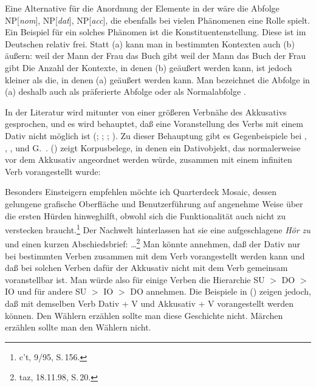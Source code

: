 \noindent
Eine Alternative für die Anordnung der Elemente in der \subcatl wäre die Abfolge 
NP[\textit{nom\/}], NP[\textit{dat}], NP[\textit{acc}], die ebenfalls bei vielen Phänomenen eine Rolle spielt. 
Ein Beispiel für ein solches Phänomen ist die Konstituentenstellung. Diese ist im Deutschen relativ frei. Statt (a) kann
man in bestimmten Kontexten auch (b) äußern:
\eal
\ex weil der Mann der Frau das Buch gibt
\ex weil der Mann das Buch der Frau gibt
\zl
Die Anzahl der Kontexte, in denen (b) geäußert werden kann, ist jedoch kleiner
als die, in denen (a) geäußert werden kann. Man bezeichnet die Abfolge in (a)
deshalb auch als präferierte Abfolge oder als Normalabfolge \citep{Hoehle82a}.

In der Literatur wird mitunter von einer größeren Verbnähe des Akkusativs gesprochen,
und es wird behauptet, daß eine Voranstellung des Verbs mit einem Dativ nicht möglich
ist (\citealt{Haftka81a}; \citealt{Haider82}; \citealt{Wegener90}; \citealt{Zifonun92a}).
Zu dieser Behauptung gibt es Gegenbeispiele bei \citet{Uszkoreit87a}, \citet{SS88a}, %
\citet{Oppenrieder91a}, \citet{Grewendorf93} und G.\ \citet[]{GMueller98a}.
() zeigt Korpusbelege, in denen ein Dativobjekt, das normalerweise vor dem Akkusativ
angeordnet werden würde, zusammen mit einem infiniten Verb vorangestellt wurde:

\eal
\label{bsp-syntax-pvp-besonders}
\ex Besonders Einsteigern empfehlen möchte ich Quarterdeck Mosaic, dessen gelungene grafische 
    Oberfläche und Benutzerführung auf angenehme Weise über die ersten Hürden 
    hinweghilft, obwohl sich die Funktionalität auch nicht zu verstecken braucht.\footnote{
      c't, 9/95, S.\,156.}
\ex Der Nachwelt hinterlassen hat sie eine aufgeschlagene \textit{Hör zu\/} und einen kurzen
    Abschiedsbrief: \ldots\footnote{
      taz, 18.11.98, S.\,20.}
\zl
Man könnte annehmen, daß der Dativ nur bei bestimmten Verben zusammen mit dem Verb vorangestellt
werden kann und daß bei solchen Verben dafür der Akkusativ nicht mit dem Verb gemeinsam
voranstellbar ist. Man würde also für einige Verben die Hierarchie SU $>$ DO $>$ IO und für andere
SU $>$ IO $>$ DO annehmen. Die Beispiele in () zeigen jedoch, daß mit demselben Verb Dativ +
V und Akkusativ + V vorangestellt werden können.
\eal
\label{bsp-acc-dat-pvp}
\ex Den Wählern erzählen sollte man diese Geschichte nicht.
\ex Märchen erzählen sollte man den Wählern nicht.
\zl
{}

